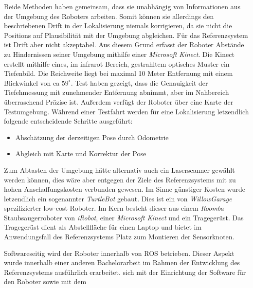Beide Methoden haben gemeinsam, dass sie unabhängig von Informationen aus der
Umgebung des Roboters arbeiten. Somit können sie allerdings den beschriebenen
Drift in der Lokalisierung niemals korrigieren, da sie nicht die Positions auf
Plausibilität mit der Umgebung abgleichen. 
Für das Referenzsystem ist Drift aber nicht akzeptabel. Aus diesem Grund
erfasst der Roboter Abstände zu Hindernissen seiner Umgebung mithilfe einer
\textit{Microsoft Kinect}. Die Kinect erstellt mithilfe eines, im infrarot
Bereich, gestrahltem optisches Muster ein Tiefenbild. 
Die Reichweite liegt bei maximal 10 Meter Entfernung mit
einem Blickwinkel von ca $59^{\circ}$. Test haben gezeigt, dass die Genauigkeit der
Tiefehmessung mit zunehmender Entfernung abnimmt, aber im Nahbereich
überraschend Präzise ist.
Außerdem verfügt der Roboter über eine Karte der
Testumgebung. Während einer Testfahrt werden für
eine Lokalisierung letzendlich folgende entscheidende Schritte ausgeführt:

\begin{itemize}
  \item Abschätzung der derzeitigen Pose durch Odometrie
  \item Abgleich mit Karte und Korrektur der Pose
\end{itemize}

Zum Abtasten der Umgebung hätte alternativ auch ein Laserscanner gewählt werden
können, dies wäre aber entgegen der Ziele des Referenzsystems mit zu hohen
Anschaffungskosten verbunden gewesen. Im Sinne günstiger Kosten wurde 
letzendlich ein sogenannter \textit{TurtleBot} gebaut. Dies ist ein
von \textit{WillowGarage} spezifizierter low-cost Roboter. Im Kern
besteht dieser aus einem \textit{Roomba} Staubsaugerroboter von \textit{iRobot}, einer
\textit{Microsoft Kinect} und ein Tragegerüst. Das Tragegerüst dient als
Abstellfläche für einen Laptop und bietet im Anwendungsfall des Referenzsystems
Platz zum Montieren der Sensorknoten.


Softwareseitig wird der Roboter innerhalb von \gls{ROS} betrieben. Dieser
Aspekt wurde innerhalb einer anderen Bachelorarbeit im Rahmen der Entwicklung des
Referenzsystems ausführlich erarbeitet. 
sich mit der Einrichtung der Software für
den Roboter sowie mit dem 
